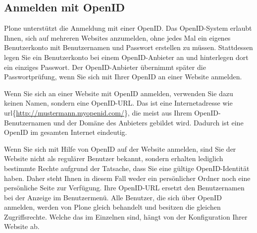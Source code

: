 \documentclass[a4paper,12pt,ngerman]{manual}
\begin{document}
\subsection{Anmelden mit OpenID}

Plone unterstützt die Anmeldung mit einer OpenID. Das OpenID-System
erlaubt Ihnen, sich auf mehreren Websites anzumelden, ohne jedes Mal
ein eigenes Benutzerkonto mit Benutzernamen und Passwort erstellen zu
müssen. Stattdessen legen Sie ein Benutzerkonto bei einem
OpenID-Anbieter an und hinterlegen dort ein einziges Passwort. Der
OpenID-Anbieter übernimmt später die Passwortprüfung, wenn Sie sich
mit Ihrer OpenID an einer Website anmelden.

Wenn Sie sich an einer Website mit OpenID anmelden, verwenden Sie dazu
keinen Namen, sondern eine OpenID-URL. Das ist eine Internetadresse
wie url\{\href{http://mustermann.myopenid.com/}{http://mustermann.myopenid.com/}\}, die meist aus Ihrem
OpenID-Benutzernamen und der Domäne des Anbieters gebildet
wird. Dadurch ist eine OpenID im gesamten Internet eindeutig.

Wenn Sie sich mit Hilfe von OpenID auf der Website anmelden, sind Sie
der Website nicht als regulärer Benutzer bekannt, sondern erhalten
lediglich bestimmte Rechte aufgrund der Tatsache, dass Sie eine
gültige OpenID-Identität haben. Daher steht Ihnen in diesem Fall weder
ein persönlicher Ordner noch eine persönliche Seite zur
Verfügung. Ihre OpenID-URL ersetzt den Benutzernamen bei der Anzeige
im Benutzermenü. Alle Benutzer, die sich über OpenID anmelden, werden
von Plone gleich behandelt und besitzen die gleichen
Zugriffsrechte. Welche das im Einzelnen sind, hängt von der
Konfiguration Ihrer Website ab.
\end{document}
